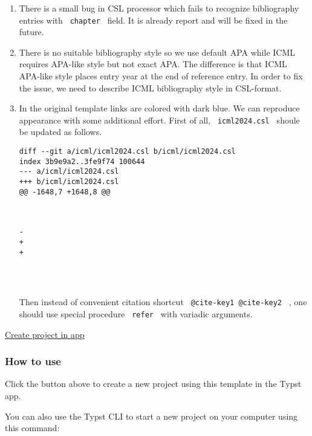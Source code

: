\begin{enumerate}
\item
  There is a small bug in CSL processor which fails to recognize
  bibliography entries with \texttt{\ chapter\ } field. It is already
  report and will be fixed in the future.
\item
  There is no suitable bibliography style so we use default APA while
  ICML requires APA-like style but not exact APA. The difference is that
  ICML APA-like style places entry year at the end of reference entry.
  In order to fix the issue, we need to describe ICML bibliography style
  in CSL-format.
\item
  In the original template links are colored with dark blue. We can
  reproduce appearance with some additional effort. First of all,
  \texttt{\ icml2024.csl\ } shoule be updated as follows.

\begin{verbatim}
diff --git a/icml/icml2024.csl b/icml/icml2024.csl
index 3b9e9a2..3fe9f74 100644
--- a/icml/icml2024.csl
+++ b/icml/icml2024.csl
@@ -1648,7 +1648,8 @@
       
       
     
-    
+    
+    
       
         
         
\end{verbatim}

  Then instead of convenient citation shortcut
  \texttt{\ @cite-key1\ @cite-key2\ } , one should use special procedure
  \texttt{\ refer\ } with variadic arguments.

\begin{Shaded}
\begin{Highlighting}[]
\end{Highlighting}
\end{Shaded}
\end{enumerate}

\href{/app?template=lucky-icml&version=0.2.1}{Create project in app}

\subsubsection{How to use}\label{how-to-use}

Click the button above to create a new project using this template in
the Typst app.

You can also use the Typst CLI to start a new project on your computer
using this command:

